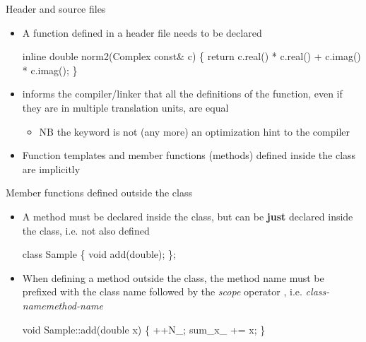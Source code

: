 \begin{frame}[fragile]{Header and source files \insertcontinuationtext}

  \begin{itemize}[<+->]
  \item A function defined in a header file needs to be declared
    \textbf{}
    \begin{codeblock}
\alert{inline} double norm2(Complex const& c)
\{
  return c.real() * c.real() + c.imag() * c.imag();
\}\end{codeblock}

  \item {} informs the compiler/linker that all the
    definitions of the function, even if they are in multiple
    translation units, are equal
    \begin{itemize}
    \item NB the  keyword is not (any more) an
      optimization hint to the compiler
    \end{itemize}
  \item Function templates and member functions (methods) defined
    inside the class are implicitly 
  \end{itemize}

\end{frame}

\begin{frame}[fragile]{Member functions defined outside the class}

  \begin{itemize}

  \item A method must be declared inside the class, but can be \textbf{just}
    declared inside the class, i.e. not also defined

    \begin{codeblock}
class Sample \{
  \ddd
  void add(double);
\};\end{codeblock}

  \item When defining a method outside the class, the method name must be
    prefixed with the class name followed by the \textit{scope} operator
    \code{::}, i.e. \textit{class-name}\code{::}\textit{method-name}

    \begin{codeblock}
void Sample::add(double x) \{
  ++N_;
  sum_x_ += x;
  \ddd
\}\end{codeblock}

  \end{itemize}

\end{frame}

